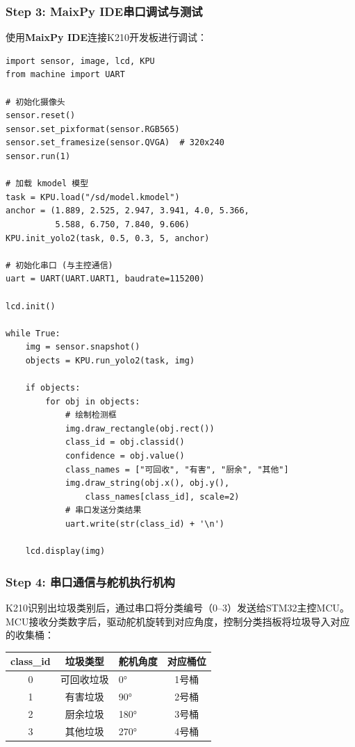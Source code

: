 \documentclass[12pt,a4paper]{ctexart}
\begin{document}
\subsubsection{Step 3: MaixPy IDE串口调试与测试}

使用\textbf{MaixPy IDE}连接K210开发板进行调试：

\begin{lstlisting}[style=pythonstyle, caption={MaixPy K210目标检测推理代码}]
import sensor, image, lcd, KPU
from machine import UART

# 初始化摄像头
sensor.reset()
sensor.set_pixformat(sensor.RGB565)
sensor.set_framesize(sensor.QVGA)  # 320x240
sensor.run(1)

# 加载 kmodel 模型
task = KPU.load("/sd/model.kmodel")
anchor = (1.889, 2.525, 2.947, 3.941, 4.0, 5.366,
          5.588, 6.750, 7.840, 9.606)
KPU.init_yolo2(task, 0.5, 0.3, 5, anchor)

# 初始化串口 (与主控通信)
uart = UART(UART.UART1, baudrate=115200)

lcd.init()

while True:
    img = sensor.snapshot()
    objects = KPU.run_yolo2(task, img)

    if objects:
        for obj in objects:
            # 绘制检测框
            img.draw_rectangle(obj.rect())
            class_id = obj.classid()
            confidence = obj.value()
            class_names = ["可回收", "有害", "厨余", "其他"]
            img.draw_string(obj.x(), obj.y(),
                class_names[class_id], scale=2)
            # 串口发送分类结果
            uart.write(str(class_id) + '\n')

    lcd.display(img)
\end{lstlisting}

\subsubsection{Step 4: 串口通信与舵机执行机构}

K210识别出垃圾类别后，通过串口将分类编号（0--3）发送给STM32主控MCU。MCU接收分类数字后，驱动舵机旋转到对应角度，控制分类挡板将垃圾导入对应的收集桶：

\begin{center}
\begin{tabular}{cclc}
\toprule
\textbf{class\_id} & \textbf{垃圾类型} & \textbf{舵机角度} & \textbf{对应桶位} \\
\midrule
0 & 可回收垃圾 & 0° & 1号桶 \\
1 & 有害垃圾   & 90° & 2号桶 \\
2 & 厨余垃圾   & 180° & 3号桶 \\
3 & 其他垃圾   & 270° & 4号桶 \\
\bottomrule
\end{tabular}
\end{center}
\end{document}
